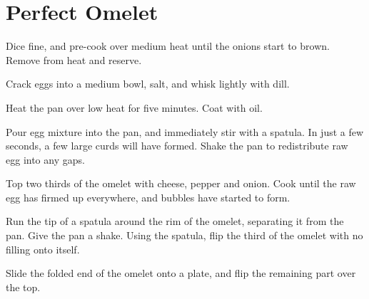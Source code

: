 
\section{Perfect Omelet}
\begin{recipe}



Dice fine, and pre-cook over medium heat until the onions start to brown. Remove from heat and reserve.


Crack eggs into a medium bowl, salt, and whisk lightly with dill.


Heat the pan over low heat for five minutes. Coat with oil.

Pour egg mixture into the pan, and immediately stir with a spatula.
In just a few seconds, a few large curds will have formed. Shake the pan to redistribute raw egg into any gaps.


Top two thirds of the omelet with cheese, pepper and onion. Cook until the raw egg has firmed up everywhere, and bubbles have started to form.

Run the tip of a spatula around the rim of the omelet, separating it from the pan. Give the pan a shake. Using the spatula, flip the third of the omelet with no filling onto itself.

Slide the folded end of the omelet onto a plate, and flip the remaining part over the top.

\end{recipe}
